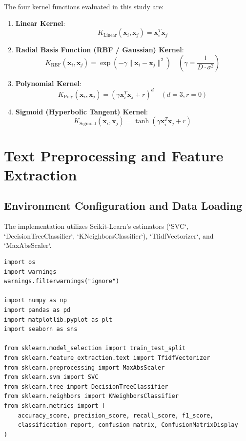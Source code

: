 \documentclass[12pt]{article}
\begin{document}
The four kernel functions evaluated in this study are:
\begin{enumerate}
    \item \textbf{Linear Kernel}:
    \begin{equation}
        K_{\text{Linear}}(\mathbf{x}_i, \mathbf{x}_j) = \mathbf{x}_i^T \mathbf{x}_j
    \end{equation}
    \item \textbf{Radial Basis Function (RBF / Gaussian) Kernel}:
    \begin{equation}
        K_{\text{RBF}}(\mathbf{x}_i, \mathbf{x}_j) = \exp\left( -\gamma \|\mathbf{x}_i - \mathbf{x}_j\|^2 \right) \quad (\gamma = \frac{1}{D \cdot \sigma^2})
    \end{equation}
    \item \textbf{Polynomial Kernel}:
    \begin{equation}
        K_{\text{Poly}}(\mathbf{x}_i, \mathbf{x}_j) = (\gamma \mathbf{x}_i^T \mathbf{x}_j + r)^d \quad (d=3, r=0)
    \end{equation}
    \item \textbf{Sigmoid (Hyperbolic Tangent) Kernel}:
    \begin{equation}
        K_{\text{Sigmoid}}(\mathbf{x}_i, \mathbf{x}_j) = \tanh\left( \gamma \mathbf{x}_i^T \mathbf{x}_j + r \right)
    \end{equation}
\end{enumerate}

\newpage
\section{Text Preprocessing and Feature Extraction}

\subsection{Environment Configuration and Data Loading}
The implementation utilizes Scikit-Learn's estimators (`SVC`, `DecisionTreeClassifier`, `KNeighborsClassifier`), `TfidfVectorizer`, and `MaxAbsScaler`.

\begin{lstlisting}[style=code]
import os
import warnings
warnings.filterwarnings("ignore")

import numpy as np
import pandas as pd
import matplotlib.pyplot as plt
import seaborn as sns

from sklearn.model_selection import train_test_split
from sklearn.feature_extraction.text import TfidfVectorizer
from sklearn.preprocessing import MaxAbsScaler
from sklearn.svm import SVC
from sklearn.tree import DecisionTreeClassifier
from sklearn.neighbors import KNeighborsClassifier
from sklearn.metrics import (
    accuracy_score, precision_score, recall_score, f1_score,
    classification_report, confusion_matrix, ConfusionMatrixDisplay
)
\end{lstlisting}
\end{document}
